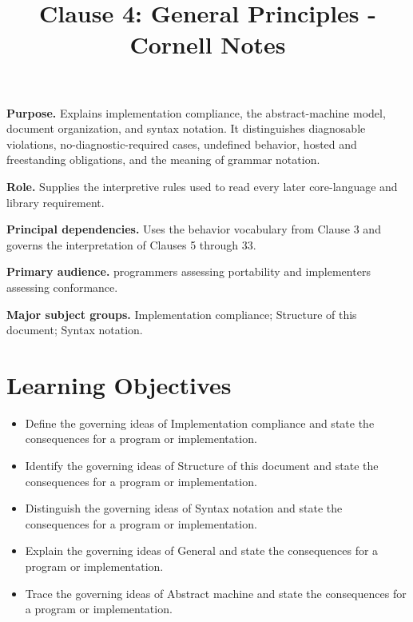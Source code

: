 \documentclass[11pt,letterpaper]{article}
\title{Clause 4: General Principles - Cornell Notes}
\author{}
\date{}
\begin{document}
\maketitle
\begin{CornellReferenceOrientationBox}
\textbf{Purpose.} Explains implementation compliance, the abstract-machine model, document organization, and syntax notation. It distinguishes diagnosable violations, no-diagnostic-required cases, undefined behavior, hosted and freestanding obligations, and the meaning of grammar notation.
\par\textbf{Role.} Supplies the interpretive rules used to read every later core-language and library requirement.
\par\textbf{Principal dependencies.} Uses the behavior vocabulary from Clause 3 and governs the interpretation of Clauses 5 through 33.
\par\textbf{Primary audience.} programmers assessing portability and implementers assessing conformance.
\par\textbf{Major subject groups.} Implementation compliance; Structure of this document; Syntax notation.
\end{CornellReferenceOrientationBox}
\section{Learning Objectives}
\begin{itemize}[label=\textcolor{CornellReferenceTeal}{$\blacktriangleright$}]
\item Define the governing ideas of Implementation compliance and state the consequences for a program or implementation.
\item Identify the governing ideas of Structure of this document and state the consequences for a program or implementation.
\item Distinguish the governing ideas of Syntax notation and state the consequences for a program or implementation.
\item Explain the governing ideas of General and state the consequences for a program or implementation.
\item Trace the governing ideas of Abstract machine and state the consequences for a program or implementation.
\end{itemize}
\end{document}
